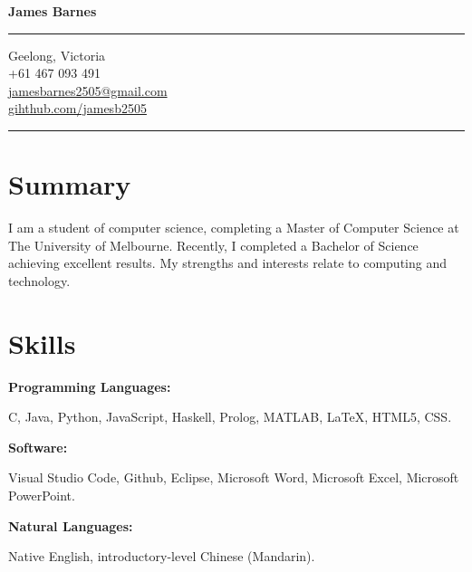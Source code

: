 \documentclass[10pt]{article}
\begin{document}
\pagestyle{empty} 

\begin{minipage}[t]{.35\textwidth}
\vspace*{0pt}

\begin{center}
{\Huge \bfseries James Barnes\par}
\end{center}

\bigskip
\hrule
\bigskip

\begin{center}
Geelong, Victoria \\
+61 467 093 491 \\
\href{mailto:jamesbarnes2505@gmail.com}{jamesbarnes2505@gmail.com} \\
\href{http://github.com/jamesb2505}{gihthub.com/jamesb2505}
\end{center}

\bigskip
\hrule
\bigskip

\section{Summary}

\begin{flushleft}
I am a student of computer science, completing a Master of Computer Science at The University of Melbourne. 
Recently, I completed a Bachelor of Science achieving excellent results.
My strengths and interests relate to computing and technology.
\end{flushleft} 

\medskip

\section{Skills}

\textbf{Programming Languages:}
\begin{flushleft}
C, Java, Python, JavaScript, Haskell, Prolog, MATLAB, {\selectfont \LaTeX{}}, HTML5, CSS. \newline
\end{flushleft}

\textbf{Software:}
\begin{flushleft}
Visual Studio Code, Github, Eclipse, Microsoft Word, Microsoft Excel, Microsoft PowerPoint. \newline
\end{flushleft}

\textbf{Natural Languages:}
\begin{flushleft}
Native English, introductory-level Chinese (Mandarin).
\end{flushleft}


\end{minipage}
\end{document}
